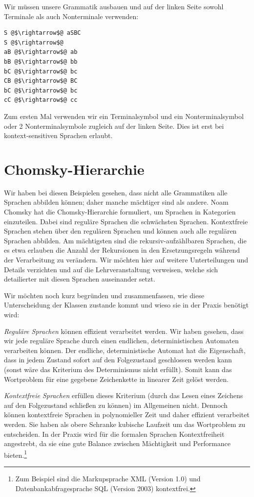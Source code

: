 Wir müssen unsere Grammatik ausbauen und auf der linken Seite sowohl Terminale als auch Nonterminale verwenden:
\begin{lstlisting}
S @$\rightarrow$@ aSBC
S @$\rightarrow$@
aB @$\rightarrow$@ ab
bB @$\rightarrow$@ bb
bC @$\rightarrow$@ bc
CB @$\rightarrow$@ BC
bC @$\rightarrow$@ bc
cC @$\rightarrow$@ cc
\end{lstlisting}

Zum ersten Mal verwenden wir ein Terminalsymbol und ein Nonterminalsymbol oder 2 Nonterminalsymbole zugleich auf der linken Seite. Dies ist erst bei kontext-sensitiven Sprachen erlaubt.

\section{Chomsky-Hierarchie}
%
Wir haben bei diesen Beispielen gesehen, dass nicht alle Grammatiken alle Sprachen abbilden können; daher manche mächtiger sind als andere. Noam Chomsky hat die Chomsky-Hierarchie formuliert, um Sprachen in Kategorien einzuteilen. Dabei sind reguläre Sprachen die schwächsten Sprachen. Kontextfreie Sprachen stehen über den regulären Sprachen und können auch alle regulären Sprachen abbilden. Am mächtigsten sind die rekursiv-aufzählbaren Sprachen, die es etwa erlauben die Anzahl der Rekursionen in den Ersetzungsregeln während der Verarbeitung zu verändern. Wir möchten hier auf weitere Unterteilungen und Details verzichten und auf die Lehrveranstaltung \courseswp{} verweisen, welche sich detailierter mit diesen Sprachen auseinander setzt.

Wir möchten noch kurz begründen und zusammenfassen, wie diese Unterscheidung der Klassen zustande kommt und wieso sie in der Praxis benötigt wird:

\emph{Reguläre Sprachen} können effizient verarbeitet werden. Wir haben gesehen, dass wir jede reguläre Sprache durch einen endlichen, deterministischen Automaten verarbeiten können. Der endliche, deterministische Automat hat die Eigenschaft, dass in jedem Zustand sofort auf den Folgezustand geschlossen werden kann (sonst wäre das Kriterium des Determinismus nicht erfüllt). Somit kann das Wortproblem für eine gegebene Zeichenkette in linearer Zeit gelöst werden.

\emph{Kontextfreie Sprachen} erfüllen dieses Kriterium (durch das Lesen eines Zeichens auf den Folgezustand schließen zu können) im Allgemeinen nicht. Dennoch können kontextfreie Sprachen in polynomieller Zeit und daher effizient verarbeitet werden. Sie haben als obere Schranke kubische Laufzeit um das Wortproblem zu entscheiden. In der Praxis wird für die formalen Sprachen Kontextfreiheit angestrebt, da sie eine gute Balance zwischen Mächtigkeit und Performance bieten.\footnote{Zum Beispiel sind die Markupsprache XML (Version 1.0) und Datenbankabfragesprache SQL (Version 2003) kontextfrei.}

